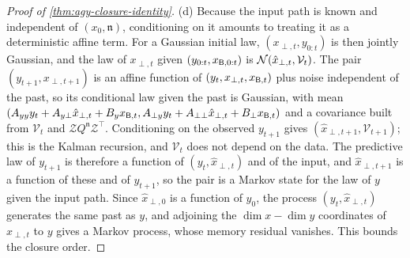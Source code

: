 \begin{proof}[Proof of \cref{thm:agy-closure-identity}]
(d) Because the input path is known and independent of $(x_0,\mathfrak n)$, conditioning on it amounts to treating it as a deterministic affine term. For a Gaussian initial law, $(x_{\perp,t},y_{0:t})$ is then jointly Gaussian, and the law of $x_{\perp,t}$ given $(y_{0:t},x_{\mathsf{B},0:t})$ is $\mathcal{N}(\hat x_{\perp,t},\mathcal V_t)$. The pair $(y_{t+1},x_{\perp,t+1})$ is an affine function of $(y_t,x_{\perp,t},x_{\mathsf{B},t})$ plus noise independent of the past, so its conditional law given the past is Gaussian, with mean $(A_{yy}y_t+A_{y\perp}\hat x_{\perp,t}+B_yx_{\mathsf{B},t},A_{\perp y}y_t+A_{\perp\perp}\hat x_{\perp,t}+B_\perp x_{\mathsf{B},t})$ and a covariance built from $\mathcal V_t$ and $\mathcal ZQ^{\mathfrak n}\mathcal Z^\top$. Conditioning on the observed $y_{t+1}$ gives $(\hat x_{\perp,t+1},\mathcal V_{t+1})$; this is the Kalman recursion, and $\mathcal V_t$ does not depend on the data. The predictive law of $y_{t+1}$ is therefore a function of $(y_t,\hat x_{\perp,t})$ and of the input, and $\hat x_{\perp,t+1}$ is a function of these and of $y_{t+1}$, so the pair is a Markov state for the law of $y$ given the input path. Since $\hat x_{\perp,0}$ is a function of $y_0$, the process $(y_t,\hat x_{\perp,t})$ generates the same past as $y$, and adjoining the $\dim x-\dim y$ coordinates of $\hat x_{\perp,t}$ to $y$ gives a Markov process, whose memory residual vanishes. This bounds the closure order.
\end{proof}

